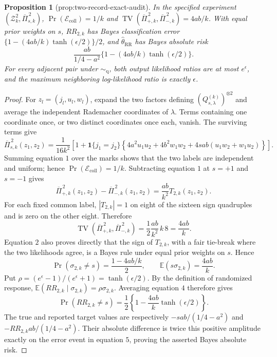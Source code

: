 \documentclass{article}
\newtheorem{proposition}{Proposition}
\begin{document}
\begin{proposition}[prop:two-record-exact-audit]\label{prop:two-record-exact-audit}
In the specified experiment \((\mathcal Z_k^2,\overline\Pi_{s,k}^{\,2})\), \(\Pr(\mathcal E_{\mathrm{coll}})=1/k\) and \(\operatorname{TV}(\overline\Pi_{+,k}^{\,2},\overline\Pi_{-,k}^{\,2})=4ab/k\). With equal prior weights on \(s\), \(RR_{2,k}\) has Bayes classification error \(\{1-(4ab/k)\tanh(\epsilon/2)\}/2\), and \(\widehat\theta_{\mathrm{RR}}\) has Bayes absolute risk \[\frac{ab}{1/4-a^2}\{1-(4ab/k)\tanh(\epsilon/2)\}.\] For every adjacent pair under \(\sim_{\mathrm q}\), both output likelihood ratios are at most \(e^\epsilon\), and the maximum neighboring log-likelihood ratio is exactly \(\epsilon\).
\end{proposition}
\begin{proof}
For \(z_l=(j_l,u_l,w_l)\), expand the two factors defining \((Q_{s,\lambda}^{(k)})^{\otimes2}\) and average the independent Rademacher coordinates of \(\lambda\).  Terms containing one coordinate once, or two distinct coordinates once each, vanish.  The surviving terms give
\[
 \overline\Pi_{s,k}^{\,2}(z_1,z_2)
 =\frac1{16k^2}\left[1+\mathbf 1\{j_1=j_2\}
 \left\{4a^2u_1u_2+4b^2w_1w_2
 +4sab(u_1w_2+w_1u_2)\right\}\right]. \tag{1}
\]
Summing equation \(1\) over the marks shows that the two labels are independent and uniform; hence \(\Pr(\mathcal E_{\mathrm{coll}})=1/k\).  Subtracting equation \(1\) at \(s=+1\) and \(s=-1\) gives
\[
 \overline\Pi_{+,k}^{\,2}(z_1,z_2)
 -\overline\Pi_{-,k}^{\,2}(z_1,z_2)
 =\frac{ab}{k^2}T_{2,k}(z_1,z_2). \tag{2}
\]
For each fixed common label, \(|T_{2,k}|=1\) on eight of the sixteen sign quadruples and is zero on the other eight.  Therefore
\[
 \operatorname{TV}(\overline\Pi_{+,k}^{\,2},\overline\Pi_{-,k}^{\,2})
 =\frac12\frac{ab}{k^2}\,k\,8=\frac{4ab}{k}. \tag{3}
\]
Equation \(2\) also proves directly that the sign of \(T_{2,k}\), with a fair tie-break where the two likelihoods agree, is a Bayes rule under equal prior weights on \(s\).  Hence
\[
 \Pr(\sigma_{2,k}\ne s)=\frac{1-4ab/k}{2},
 \qquad
 \mathbb E(s\sigma_{2,k})=\frac{4ab}{k}. \tag{4}
\]
Put \(\rho=(e^\epsilon-1)/(e^\epsilon+1)=\tanh(\epsilon/2)\).  By the definition of randomized response,
\(\mathbb E(RR_{2,k}\mid\sigma_{2,k})=\rho\sigma_{2,k}\).  Averaging equation \(4\) therefore gives
\[
 \Pr(RR_{2,k}\ne s)
 =\frac12\left\{1-\frac{4ab}{k}\tanh(\epsilon/2)\right\}. \tag{5}
\]
The true and reported target values are respectively
\(-sab/(1/4-a^2)\) and \(-RR_{2,k}ab/(1/4-a^2)\).  Their absolute difference is twice this positive amplitude exactly on the error event in equation \(5\), proving the asserted Bayes absolute risk.


\end{proof}
\end{document}
